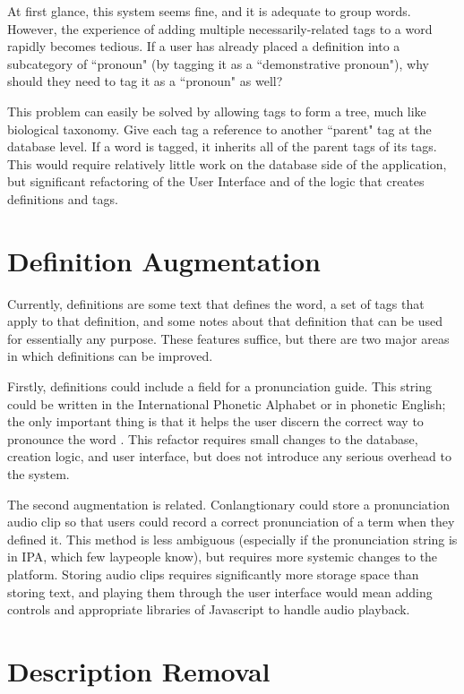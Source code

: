 At first glance, this system seems fine, and it is adequate to group words. However, the experience of adding multiple necessarily-related tags to a word rapidly becomes tedious. If a user has already placed a definition into a subcategory of ``pronoun" (by tagging it as a ``demonstrative pronoun"), why should they need to tag it as a ``pronoun" as well?

This problem can easily be solved by allowing tags to form a tree, much like biological taxonomy. Give each tag a reference to another ``parent" tag at the database level. If a word is tagged, it inherits all of the parent tags of its tags. This would require relatively little work on the database side of the application, but significant refactoring of the User Interface and of the logic that creates definitions and tags.

\section{Definition Augmentation}
\label{sec:refactor-definitions}

Currently, definitions are some text that defines the word, a set of tags that apply to that definition, and some notes about that definition that can be used for essentially any purpose. These features suffice, but there are two major areas in which definitions can be improved.

Firstly, definitions could include a field for a pronunciation guide. This string could be written in the International Phonetic Alphabet or in phonetic English; the only important thing is that it helps the user discern the correct way to pronounce the word \cite{IPA}. This refactor requires small changes to the database, creation logic, and user interface, but does not introduce any serious overhead to the system.

The second augmentation is related. Conlangtionary could store a pronunciation audio clip so that users could record a correct pronunciation of a term when they defined it. This method is less ambiguous (especially if the pronunciation string is in IPA, which few laypeople know), but requires more systemic changes to the platform. Storing audio clips requires significantly more storage space than storing text, and playing them through the user interface would mean adding controls and appropriate libraries of Javascript to handle audio playback.

\section{Description Removal}
\label{sec:refactor-description}

